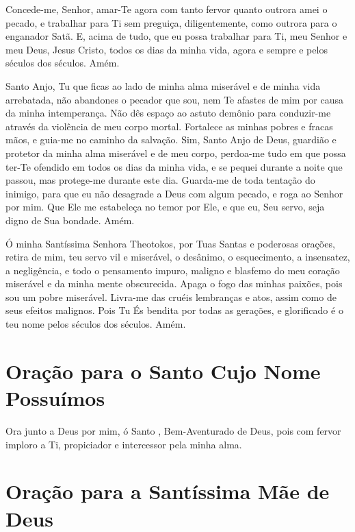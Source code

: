 \documentclass{subfiles}
\begin{document}
Concede-me, Senhor, amar-Te agora com tanto fervor quanto outrora amei o pecado,
e trabalhar para Ti sem preguiça, diligentemente, como outrora para o enganador
Satã. E, acima de tudo, que eu possa trabalhar para Ti, meu Senhor e meu Deus,
Jesus Cristo, todos os dias da minha vida, agora e sempre e pelos séculos dos
séculos. Amém.


Santo Anjo, Tu que ficas ao lado de minha alma miserável e de minha vida
arrebatada, não abandones o pecador que sou, nem Te afastes de mim por causa da
minha intemperança. Não dês espaço ao astuto demônio para conduzir-me através da
violência de meu corpo mortal. Fortalece as minhas pobres e fracas mãos, e
guia-me no caminho da salvação. Sim, Santo Anjo de Deus, guardião e protetor da
minha alma miserável e de meu corpo, perdoa-me tudo em que possa ter-Te ofendido
em todos os dias da minha vida, e se pequei durante a noite que passou, mas
protege-me durante este dia. Guarda-me de toda tentação do inimigo, para que
eu não desagrade a Deus com algum pecado, e roga ao Senhor por mim. Que Ele me
estabeleça no temor por Ele, e que eu, Seu servo, seja digno de Sua bondade.
Amém.


Ó minha Santíssima Senhora Theotokos, por Tuas Santas e poderosas orações,
retira de mim, teu servo vil e miserável, o desânimo, o esquecimento, a
insensatez, a negligência, e todo o pensamento impuro, maligno e blasfemo do meu
coração miserável e da minha mente obscurecida. Apaga o fogo das minhas paixões,
pois sou um pobre miserável. Livra-me das cruéis lembranças e atos, assim como
de seus efeitos malignos. Pois Tu És bendita por todas as gerações, e
glorificado é o teu nome pelos séculos dos séculos. Amém.

\section*{Oração para o Santo Cujo Nome Possuímos}

Ora junto a Deus por mim, ó Santo , Bem-Aventurado de
Deus, pois com fervor imploro a Ti, propiciador e intercessor pela minha alma.

\section*{Oração para a Santíssima Mãe de Deus}
\end{document}
